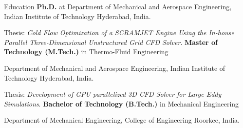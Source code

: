 \begin{rubric}{Education}
\entry*[2014 -- 2020]%
	\textbf{Ph.D.} at Department of Mechanical and Aerospace Engineering, Indian Institute of Technology Hyderabad, India. \par
      {Thesis}: \emph{Cold Flow Optimization of a SCRAMJET Engine Using the In-house Parallel Three-Dimensional Unstructured Grid CFD Solver}.%
\entry*[2012 -- 2014]%
	\textbf{Master of Technology (M.Tech.)} in Thermo-Fluid Engineering\par Department of Mechanical and Aerospace Engineering, Indian Institute of Technology Hyderabad, India. \par
      {Thesis}: \emph{Development of GPU parallelized 3D CFD Solver for Large Eddy Simulations}.  %
\entry*[2007 -- 2011]%
	\textbf{Bachelor of Technology (B.Tech.)} in Mechanical Engineering\par
	Department of Mechanical Engineering, College of Engineering Roorkee, India.
\end{rubric}